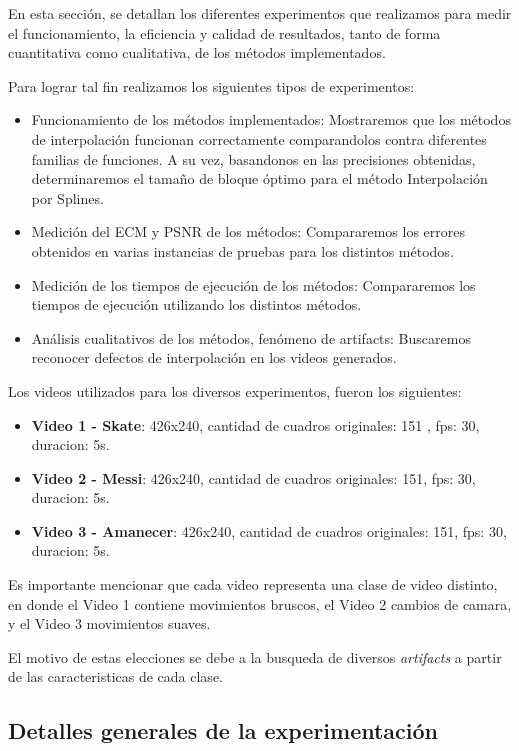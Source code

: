 En esta sección, se detallan los diferentes experimentos que realizamos para medir el funcionamiento, la eficiencia y calidad de resultados, tanto de forma cuantitativa como cualitativa, de los métodos implementados.

Para lograr tal fin realizamos los siguientes tipos de experimentos:
\begin{itemize}
  \item Funcionamiento de los métodos implementados: Mostraremos que los métodos
        de interpolación funcionan correctamente comparandolos contra diferentes
        familias de funciones. A su vez, basandonos en las precisiones obtenidas,
        determinaremos el tamaño de bloque óptimo para el método Interpolación por Splines.
  \item Medición del ECM y PSNR de los métodos: Compararemos los errores obtenidos
        en varias instancias de pruebas para los distintos métodos.
  \item Medición de los tiempos de ejecución de los métodos: Compararemos los
        tiempos de ejecución utilizando los distintos métodos.
  \item Análisis cualitativos de los métodos, fenómeno de artifacts: Buscaremos
        reconocer defectos de interpolación en los videos generados.
\end{itemize}

Los videos utilizados para los diversos experimentos, fueron los siguientes:

\begin{itemize}
  \item \textbf{Video 1 - Skate}: 426x240, cantidad de cuadros originales: 151 , fps: 30, duracion: 5s.
  \item \textbf{Video 2 - Messi}: 426x240, cantidad de cuadros originales: 151, fps: 30, duracion: 5s.
  \item \textbf{Video 3 - Amanecer}: 426x240, cantidad de cuadros originales: 151, fps: 30, duracion: 5s.
\end{itemize}

Es importante mencionar que cada video representa una clase de video distinto, en donde el Video 1 contiene movimientos bruscos, el Video 2 cambios de camara, y el Video 3 movimientos suaves.

El motivo de estas elecciones se debe a la busqueda de diversos \textit{artifacts} a partir de las caracteristicas de cada clase.

\subsection{Detalles generales de la experimentación}

